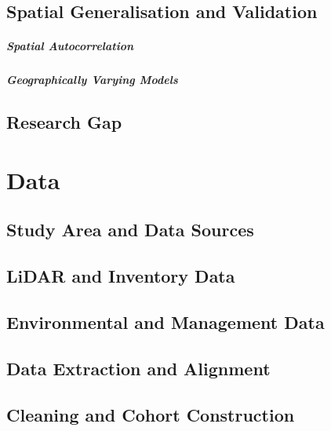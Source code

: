 \documentclass[logo,msc]{Original/infthesis}           %
\begin{document}
\section{Spatial Generalisation and Validation}

\paragraph{Spatial Autocorrelation}

\paragraph{Geographically Varying Models}

\section{Research Gap}

\chapter{Data}

\section{Study Area and Data Sources}

\section{LiDAR and Inventory Data}

\section{Environmental and Management Data}

\section{Data Extraction and Alignment}

\section{Cleaning and Cohort Construction}
\end{document}
